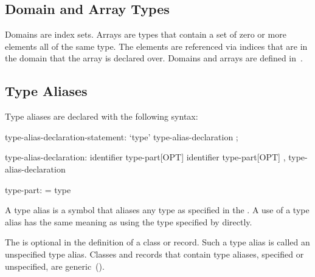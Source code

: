 \subsection{Domain and Array Types}
\label{Domain_and_Array_Types}

Domains are index sets.  Arrays are types that contain a set of zero
or more elements all of the same type.  The elements are referenced
via indices that are in the domain that the array is declared over.
Domains and arrays are defined in~.

\subsection{Type Aliases}
\label{Type_Aliases}

Type aliases are declared with the following syntax:
\begin{syntax}
type-alias-declaration-statement:
  `type' type-alias-declaration ;

type-alias-declaration:
  identifier type-part[OPT]
  identifier type-part[OPT] , type-alias-declaration

type-part:
  = type
\end{syntax}
A type alias is a symbol that aliases any type as specified in the
.  A use of a type alias has the same meaning as using
the type specified by  directly.

The  is optional in the definition of a class or
record.  Such a type alias is called an unspecified type
alias. Classes and records that contain type aliases, specified or
unspecified, are generic~().

